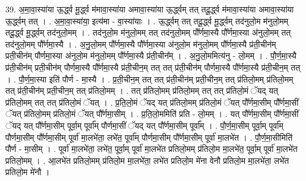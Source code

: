 \documentclass[17pt]{extarticle}
\begin{document}
39. अ॒मा॒वा॒स्या॑या ऊ॒र्द्ध्व मू॒र्द्ध्व म॑मावा॒स्या॑या अमावा॒स्या॑या ऊ॒र्द्ध्वम् तत् तदू॒र्द्ध्व म॑मावा॒स्या॑या अमावा॒स्या॑या ऊ॒र्द्ध्वम् तत् । . अ॒मा॒वा॒स्या॑या॒ इत्य॑मा - वा॒स्या॑याः । . ऊ॒र्द्ध्वम् तत् तदू॒र्द्ध्व मू॒र्द्ध्वम् तद॑नुलो॒म म॑नुलो॒मम् तदू॒र्द्ध्व मू॒र्द्ध्वम् तद॑नुलो॒मम् । . तद॑नुलो॒म म॑नुलो॒मम् तत् तद॑नुलो॒मम् पौ᳚र्णमा॒स्यै पौ᳚र्णमा॒स्या अ॑नुलो॒मम् तत् तद॑नुलो॒मम् 
पौ᳚र्णमा॒स्यै । . अ॒नु॒लो॒मम् पौ᳚र्णमा॒स्यै पौ᳚र्णमा॒स्या अ॑नुलो॒म म॑नुलो॒मम् पौ᳚र्णमा॒स्यै प्र॑ती॒चीन॑म् प्रती॒चीन॑म् पौर्णमा॒स्या अ॑नुलो॒म म॑नुलो॒मम् पौ᳚र्णमा॒स्यै प्र॑ती॒चीन᳚म् । . अ॒नु॒लो॒ममित्य॑नु - लो॒मम् । . पौ॒र्ण॒मा॒स्यै प्र॑ती॒चीन॑म् प्रती॒चीन॑म् पौर्णमा॒स्यै पौ᳚र्णमा॒स्यै प्र॑ती॒चीन॒म् तत् तत् प्र॑ती॒चीन॑म् पौर्णमा॒स्यै पौ᳚र्णमा॒स्यै प्र॑ती॒चीन॒म् तत् । . पौ॒र्ण॒मा॒स्या इति॑ पौर्ण - मा॒स्यै । . प्र॒ती॒चीन॒म् तत् तत् प्र॑ती॒चीन॑म् प्रती॒चीन॒म् तत् प्र॑तिलो॒मम् प्र॑तिलो॒मम् तत् प्र॑ती॒चीन॑म् प्रती॒चीन॒म् तत् प्र॑तिलो॒मम् । . तत् प्र॑तिलो॒मम् प्र॑तिलो॒मम् तत् तत् प्र॑तिलो॒मं ॅयद् यत् प्र॑तिलो॒मम् तत् तत् प्र॑तिलो॒मं ॅयत् । . प्र॒ति॒लो॒मं ॅयद् यत् प्र॑तिलो॒मम् प्र॑तिलो॒मं ॅयत् पौ᳚र्णमा॒सीम् पौ᳚र्णमा॒सीं ॅयत् प्र॑तिलो॒मम् प्र॑तिलो॒मं ॅयत् पौ᳚र्णमा॒सीम् । . प्र॒ति॒लो॒ममिति॑ प्रति - लो॒मम् । . यत् पौ᳚र्णमा॒सीम् पौ᳚र्णमा॒सीं ॅयद् यत् पौ᳚र्णमा॒सीम् पूर्वा॒म् पूर्वा᳚म् पौर्णमा॒सीं ॅयद् यत् पौ᳚र्णमा॒सीम् पूर्वा᳚म् । . पौ॒र्ण॒मा॒सीम् पूर्वा॒म् पूर्वा᳚म् पौर्णमा॒सीम् पौ᳚र्णमा॒सीम् पूर्वा॑ मा॒लभे॑ता॒ लभे॑त॒ पूर्वा᳚म् पौर्णमा॒सीम् पौ᳚र्णमा॒सीम् पूर्वा॑ मा॒लभे॑त । . पौ॒र्ण॒मा॒सीमिति॑ पौर्ण - मा॒सीम् । . पूर्वा॑ मा॒लभे॑ता॒ लभे॑त॒ पूर्वा॒म् पूर्वा॑ मा॒लभे॑त प्रतिलो॒मम् प्र॑तिलो॒म मा॒लभे॑त॒ पूर्वा॒म् पूर्वा॑ मा॒लभे॑त प्रतिलो॒मम् । . आ॒लभे॑त प्रतिलो॒मम् प्र॑तिलो॒म मा॒लभे॑ता॒ लभे॑त प्रतिलो॒म मे॑ना वेनौ प्रतिलो॒म मा॒लभे॑ता॒ लभे॑त प्रतिलो॒म मे॑नौ । \newline
\end{document}
